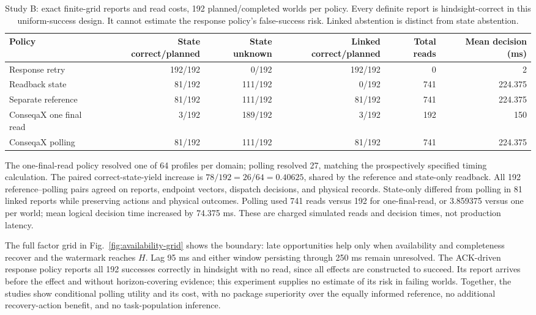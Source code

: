 \begin{table}[t]
\caption{Study B: exact finite-grid reports and read costs, 192 planned/completed worlds per policy. Every definite report is hindsight-correct in this uniform-success design. It cannot estimate the response policy's false-success risk. Linked abstention is distinct from state abstention.}
\label{tab:availability-results}
\centering\small
\setlength{\tabcolsep}{4pt}
\begin{tabular}{lrrrrr}
\toprule
Policy & State correct/planned & State unknown & Linked correct/planned & Total reads & Mean decision (ms) \\
\midrule
Response retry & 192/192 & 0/192 & 192/192 & 0 & 2 \\
Readback state & 81/192 & 111/192 & 0/192 & 741 & 224.375 \\
Separate reference & 81/192 & 111/192 & 81/192 & 741 & 224.375 \\
ConseqaX one final read & 3/192 & 189/192 & 3/192 & 192 & 150 \\
ConseqaX polling & 81/192 & 111/192 & 81/192 & 741 & 224.375 \\
\bottomrule
\end{tabular}
\end{table}

The one-final-read policy resolved one of 64 profiles per domain; polling resolved 27, matching the prospectively specified timing calculation. The paired correct-state-yield increase is $78/192=26/64=0.40625$, shared by the reference and state-only readback. All 192 reference--polling pairs agreed on reports, endpoint vectors, dispatch decisions, and physical records. State-only differed from polling in 81 linked reports while preserving actions and physical outcomes. Polling used 741 reads versus 192 for one-final-read, or 3.859375 versus one per world; mean logical decision time increased by 74.375 ms. These are charged simulated reads and decision times, not production latency.

The full factor grid in Fig.~\ref{fig:availability-grid} shows the boundary: late opportunities help only when availability and completeness recover and the watermark reaches $H$. Lag 95 ms and either window persisting through 250 ms remain unresolved. The ACK-driven response policy reports all 192 successes correctly in hindsight with no read, since all effects are constructed to succeed. Its report arrives before the effect and without horizon-covering evidence; this experiment supplies no estimate of its risk in failing worlds. Together, the studies show conditional polling utility and its cost, with no package superiority over the equally informed reference, no additional recovery-action benefit, and no task-population inference.

